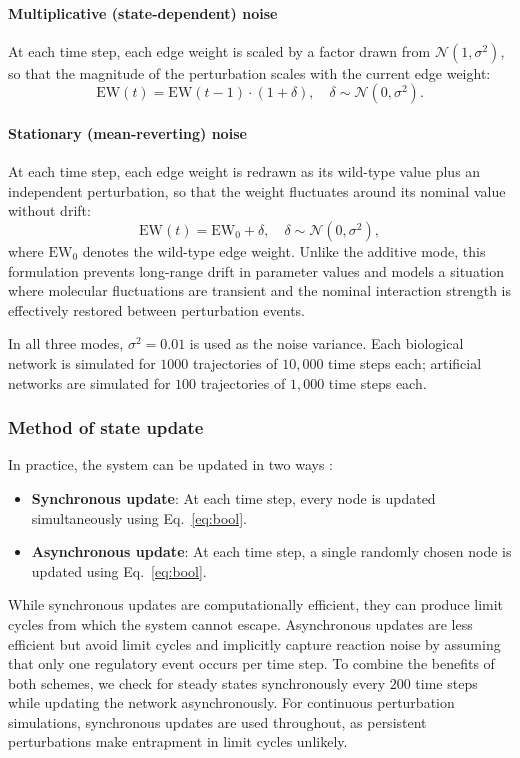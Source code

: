 \documentclass[11pt]{article}
\begin{document}
\paragraph{Multiplicative (state-dependent) noise}
At each time step, each edge weight is scaled by a factor drawn from $\mathcal{N}(1, \sigma^2)$, so that the magnitude of the perturbation scales with the current edge weight:
\begin{equation}
    \mathrm{EW}(t) = \mathrm{EW}(t-1) \cdot (1 + \delta), \quad \delta \sim \mathcal{N}(0, \sigma^2).
\end{equation}

\paragraph{Stationary (mean-reverting) noise}
At each time step, each edge weight is redrawn as its wild-type value plus an independent perturbation, so that the weight fluctuates around its nominal value without drift:
\begin{equation}
    \mathrm{EW}(t) = \mathrm{EW}_0 + \delta, \quad \delta \sim \mathcal{N}(0, \sigma^2),
\end{equation}
where $\mathrm{EW}_0$ denotes the wild-type edge weight. Unlike the additive mode, this formulation prevents long-range drift in parameter values and models a situation where molecular fluctuations are transient and the nominal interaction strength is effectively restored between perturbation events.

In all three modes, $\sigma^2 = 0.01$ is used as the noise variance. Each biological network is simulated for $1000$ trajectories of $10{,}000$ time steps each; artificial networks are simulated for $100$ trajectories of $1{,}000$ time steps each.

\subsubsection{Method of state update}
In practice, the system can be updated in two ways \cite{garg2008synchronous, schwab2020concepts}:
\begin{itemize}
    \item \textbf{Synchronous update}: At each time step, every node is updated simultaneously using Eq.~\ref{eq:bool}.
    \item \textbf{Asynchronous update}: At each time step, a single randomly chosen node is updated using Eq.~\ref{eq:bool}.
\end{itemize}
While synchronous updates are computationally efficient, they can produce limit cycles from which the system cannot escape. Asynchronous updates are less efficient but avoid limit cycles and implicitly capture reaction noise by assuming that only one regulatory event occurs per time step. To combine the benefits of both schemes, we check for steady states synchronously every $200$ time steps while updating the network asynchronously. For continuous perturbation simulations, synchronous updates are used throughout, as persistent perturbations make entrapment in limit cycles unlikely.
\end{document}
